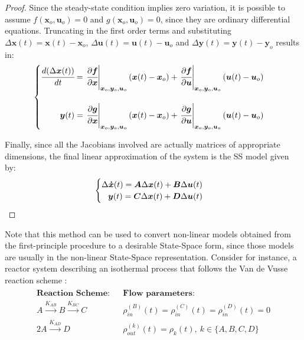 \documentclass[a4paper,11pt]{book}
\numberwithin{figure}{chapter}
\numberwithin{equation}{chapter}
\numberwithin{table}{chapter}
\theoremstyle{definition}
\begin{document}
\begin{proof}
	Since the steady-state condition implies zero variation, it is possible to assume $f(\bm{x}_o, \bm{u}_o) = 0$ and $g(\bm{x}_o, \bm{u}_o) = 0$, since they are ordinary differential equations. Truncating in the first order terms and substituting $\Delta \bm{x}(t) = \bm{x}(t) - \bm{x}_o$, $\Delta \bm{u}(t) = \bm{u}(t) - \bm{u}_o$ and $\Delta \bm{y}(t) = \bm{y}(t) - \bm{y}_o$ results in:
	\begin{align}
	\begin{cases}
		\cfrac{d(\Delta \bm{x}(t))}{dt} =\left. \cfrac{\partial \bm{f}}{\partial \bm{x}}\right\vert_{\bm{x}_o, \bm{y}_o, \bm{u}_o} (\bm{x}(t) - \bm{x}_o) + \left. \cfrac{\partial \bm{f}}{\partial \bm{u}}\right\vert_{\bm{x}_o, \bm{y}_o, \bm{u}_o}  (\bm{u}(t) - \bm{u}_o) \\ \\
		\hfill \bm{y}(t) = \left. \cfrac{\partial \bm{g}}{\partial \bm{x}}\right\vert_{\bm{x}_o, \bm{y}_o, \bm{u}_o} (\bm{x}(t) - \bm{x}_o) + \left. \cfrac{\partial \bm{g}}{\partial \bm{u}}\right\vert_{\bm{x}_o, \bm{y}_o, \bm{u}_o}  (\bm{u}(t) - \bm{u}_o) \\
	\end{cases}
	\end{align}
	
	Finally, since all the Jacobians involved are actually matrices of appropriate dimensions, the final linear approximation of the system is the SS model given by:
	\begin{align}
	\begin{cases}
		\Delta \bm{\dot{x}}(t) = \bm{A}\Delta \bm{x}(t) + \bm{B}\Delta \bm{u}(t) & \\
		\hfill \bm{y}(t) = \bm{C}\Delta \bm{x}(t) + \bm{D}\Delta \bm{u}(t) &
	\end{cases}
	\end{align}
\end{proof}

Note that this method can be used to convert non-linear models obtained from the first-principle procedure to a desirable State-Space form, since those models are usually in the non-linear State-Space representation. Consider for instance, a reactor system describing an isothermal process that follows the Van de Vusse reaction scheme \cite{VanDeVusse:1964}:
\begin{align}
\begin{matrix}
	\textbf{Reaction Scheme:}  & & \textbf{Flow parameters:} \\ 
	A\overset{K_{AB}}{\rightarrow} B \overset{K_{BC}}{\rightarrow} C & & \rho_{in}^{(B)}(t) = \rho_{in}^{(C)}(t) = \rho_{in}^{(D)}(t) = 0 \\
	2 A \overset{K_{AD}}{\rightarrow} D & &  \rho_{out}^{(k)}(t) = \rho_k(t),\ k \in \{A, B, C, D\}
\end{matrix}	
\end{align}
\end{document}
